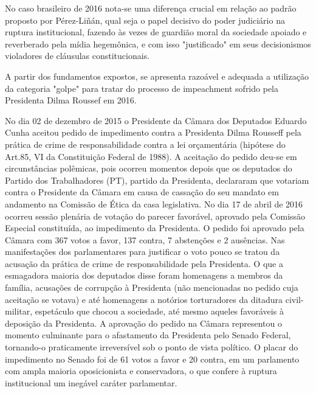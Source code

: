 No caso brasileiro de 2016 nota-se uma diferença crucial em relação ao
padrão proposto por Pérez-Liñán, qual seja o papel decisivo do poder
judiciário na ruptura institucional, fazendo às vezes de guardião moral
da sociedade apoiado e reverberado pela mídia hegemônica, e com isso
"justificado" em seus decisionismos violadores de cláusulas
constitucionais.

A partir dos fundamentos expostos, se apresenta razoável e adequada a
utilização da categoria "golpe" para tratar do processo de impeachment
sofrido pela Presidenta Dilma Roussef em 2016.

No dia 02 de dezembro de 2015 o Presidente da Câmara dos Deputados
Eduardo Cunha aceitou pedido de impedimento contra a Presidenta Dilma
Rousseff pela prática de crime de responsabilidade contra a lei
orçamentária (hipótese do Art.85, VI da Constituição Federal de 1988). A
aceitação do pedido deu-se em circunstâncias polêmicas, pois ocorreu
momentos depois que os deputados do Partido dos Trabalhadores (PT),
partido da Presidenta, declararam que votariam contra o Presidente da
Câmara em causa de cassação do seu mandato em andamento na Comissão de
Ética da casa legislativa. No dia 17 de abril de 2016 ocorreu sessão
plenária de votação do parecer favorável, aprovado pela Comissão
Especial constituída, ao impedimento da Presidenta. O pedido foi
aprovado pela Câmara com 367 votos a favor, 137 contra, 7 abstenções e 2
ausências. Nas manifestações dos parlamentares para justificar o voto
pouco se tratou da acusação da prática de crime de responsabilidade pela
Presidenta. O que a esmagadora maioria dos deputados disse foram
homenagens a membros da família, acusações de corrupção à Presidenta
(não mencionadas no pedido cuja aceitação se votava) e até homenagens a
notórios torturadores da ditadura civil-militar, espetáculo que chocou a
sociedade, até mesmo aqueles favoráveis à deposição da Presidenta. A
aprovação do pedido na Câmara representou o momento culminante para o
afastamento da Presidenta pelo Senado Federal, tornando-o praticamente
irreversível sob o ponto de vista político. O placar do impedimento no
Senado foi de 61 votos a favor e 20 contra, em um parlamento com ampla
maioria oposicionista e conservadora, o que confere à ruptura
institucional um inegável caráter parlamentar.

